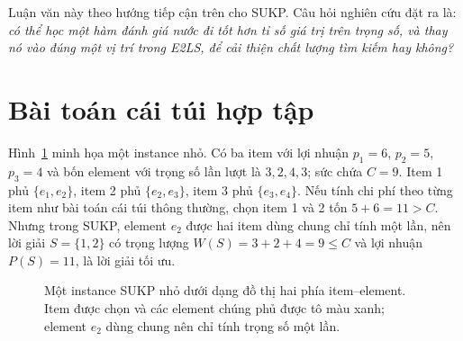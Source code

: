 Luận văn này theo hướng tiếp cận trên cho SUKP. Câu hỏi nghiên cứu đặt ra là: \emph{có thể học một hàm đánh giá nước đi tốt hơn tỉ số giá trị trên trọng số, và thay nó vào đúng một vị trí trong E2LS, để cải thiện chất lượng tìm kiếm hay không?}

\section{Bài toán cái túi hợp tập}

Hình~\ref{fig:sukp_example} minh họa một instance nhỏ. Có ba item với lợi nhuận $p_1=6$, $p_2=5$, $p_3=4$ và bốn element với trọng số lần lượt là $3,2,4,3$; sức chứa $C=9$. Item 1 phủ $\{e_1,e_2\}$, item 2 phủ $\{e_2,e_3\}$, item 3 phủ $\{e_3,e_4\}$. Nếu tính chi phí theo từng item như bài toán cái túi thông thường, chọn item 1 và 2 tốn $5+6=11>C$. Nhưng trong SUKP, element $e_2$ được hai item dùng chung chỉ tính một lần, nên lời giải $S=\{1,2\}$ có trọng lượng $W(S)=3+2+4=9\le C$ và lợi nhuận $P(S)=11$, là lời giải tối ưu.

\begin{figure}[H]
\centering
{}
\caption{Một instance SUKP nhỏ dưới dạng đồ thị hai phía item--element. Item được chọn và các element chúng phủ được tô màu xanh; element $e_2$ dùng chung nên chỉ tính trọng số một lần.}
\label{fig:sukp_example}
\end{figure}

